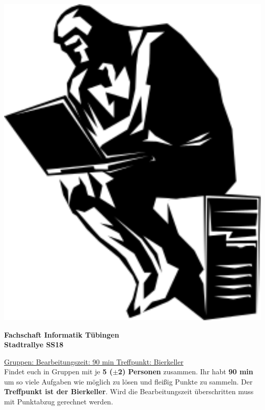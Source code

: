 \documentclass[11pt,paper=a4,answers]{exam}
\begin{document}
	
\noindent
\begin{minipage}[l]{.1\textwidth}
\noindent
\includegraphics[width=1.5\textwidth]{graphics/denker}
\end{minipage}
\begin{minipage}[r]{.8\textwidth}
\begin{center}
{\large \bfseries Fachschaft Informatik Tübingen \\
\Large Stadtrallye SS18 \par}
\end{center}
\end{minipage}
\par
\vspace{0.5cm}
\noindent
\uline{Gruppen:\hspace{2cm} \hfill Bearbeitungszeit: 90 min   \hfill     Treffpunkt: Bierkeller}
\vspace{0.5cm}\\
Findet euch in Gruppen mit je \textbf{5 ($\pm$2) Personen} zusammen. Ihr habt \textbf{90 min} um so viele Aufgaben wie möglich zu lösen und fleißig Punkte zu sammeln. Der \textbf{Treffpunkt ist der Bierkeller}. Wird die Bearbeitungszeit überschritten muss mit Punktabzug gerechnet werden.
\end{document}
